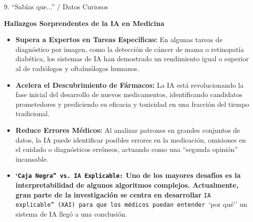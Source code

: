 \documentclass[aspectratio=169]{beamer}
\begin{document}
\begin{frame}[fragile]{9. ``Sabías que...'' / Datos Curiosos}


\textbf{Hallazgos Sorprendentes de la IA en Medicina}
\begin{itemize}
  \item \textbf{Supera a Expertos en Tareas Específicas:} En algunas tareas de diagnóstico por imagen, como la detección de cáncer de mama o retinopatía diabética, los sistemas de IA han demostrado un rendimiento igual o superior al de radiólogos y oftalmólogos humanos.
  \item \textbf{Acelera el Descubrimiento de Fármacos:} La IA está revolucionando la fase inicial del desarrollo de nuevos medicamentos, identificando candidatos prometedores y prediciendo su eficacia y toxicidad en una fracción del tiempo tradicional.
  \item \textbf{Reduce Errores Médicos:} Al analizar patrones en grandes conjuntos de datos, la IA puede identificar posibles errores en la medicación, omisiones en el cuidado o diagnósticos erróneos, actuando como una ``segunda opinión'' incansable.
  \item \textbf{`\texttt{Caja Negra'' vs. IA Explicable:} Uno de los mayores desafíos es la interpretabilidad de algunos algoritmos complejos. Actualmente, gran parte de la investigación se centra en desarrollar }\texttt{IA explicable'' (XAI) para que los médicos puedan entender }`por qué'' un sistema de IA llegó a una conclusión.
\end{itemize}
\end{frame}
\end{document}
